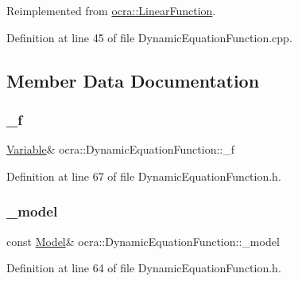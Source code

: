 Reimplemented from \hyperlink{classocra_1_1LinearFunction_a30926f977c0124a0b0f65b854ab39636}{ocra\+::\+Linear\+Function}.



Definition at line 45 of file Dynamic\+Equation\+Function.\+cpp.



\subsection{Member Data Documentation}
\hypertarget{classocra_1_1DynamicEquationFunction_a70499af5c86e68836acb7251b37ab668}{}\label{classocra_1_1DynamicEquationFunction_a70499af5c86e68836acb7251b37ab668} 
\subsubsection{\texorpdfstring{\+\_\+f}{\_f}}
{\footnotesize\ttfamily \hyperlink{classocra_1_1Variable}{Variable}\& ocra\+::\+Dynamic\+Equation\+Function\+::\+\_\+f\hspace{0.3cm}{\ttfamily [protected]}}



Definition at line 67 of file Dynamic\+Equation\+Function.\+h.

\hypertarget{classocra_1_1DynamicEquationFunction_ad0c5d639974a97aa3ed3f0bbe0f8189d}{}\label{classocra_1_1DynamicEquationFunction_ad0c5d639974a97aa3ed3f0bbe0f8189d} 
\subsubsection{\texorpdfstring{\+\_\+model}{\_model}}
{\footnotesize\ttfamily const \hyperlink{classocra_1_1Model}{Model}\& ocra\+::\+Dynamic\+Equation\+Function\+::\+\_\+model\hspace{0.3cm}{\ttfamily [protected]}}



Definition at line 64 of file Dynamic\+Equation\+Function.\+h.

\hypertarget{classocra_1_1DynamicEquationFunction_a8a6dfb64fcca3c42a9e7ad637706a6cc}{}\label{classocra_1_1DynamicEquationFunction_a8a6dfb64fcca3c42a9e7ad637706a6cc} 
